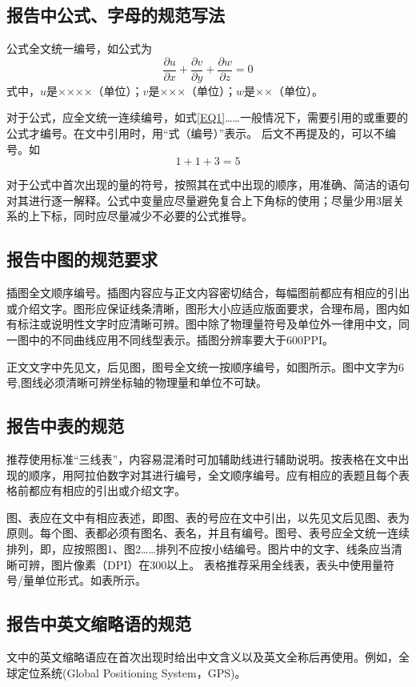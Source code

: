 \documentclass{iceli}
\begin{document}
\subsection{报告中公式、字母的规范写法}
公式全文统一编号，如公式为
\begin{equation}\label{EQ1}
\frac{\partial u}{\partial x}+\frac{\partial v}{\partial y}+\frac{\partial w}{\partial z}=0
\end{equation}
式中，$u$是××××（单位）；$v$是×××（单位）；$w$是××（单位）。

对于公式，应全文统一连续编号，如式\eqref{EQ1}……一般情况下，需要引用的或重要的公式才编号。在文中引用时，用“式（编号）”表示。
后文不再提及的，可以不编号。如
\begin{equation*}
1 + 1 + 3 = 5
\end{equation*}

对于公式中首次出现的量的符号，按照其在式中出现的顺序，用准确、简洁的语句对其进行逐一解释。公式中变量应尽量避免复合上下角标的使用；尽量少用3层关系的上下标，同时应尽量减少不必要的公式推导。

\subsection{报告中图的规范要求}
插图全文顺序编号。插图内容应与正文内容密切结合，每幅图前都应有相应的引出或介绍文字。图形应保证线条清晰，图形大小应适应版面要求，合理布局，图内如有标注或说明性文字时应清晰可辨。图中除了物理量符号及单位外一律用中文，同一图中的不同曲线应用不同线型表示。插图分辨率要大于600PPI。

正文文字中先见文，后见图，图号全文统一按顺序编号，如图所示。图中文字为6号,图线必须清晰可辨坐标轴的物理量和单位不可缺。

\subsection{报告中表的规范}
推荐使用标准“三线表”，内容易混淆时可加辅助线进行辅助说明。按表格在文中出现的顺序，用阿拉伯数字对其进行编号，全文顺序编号。应有相应的表题且每个表格前都应有相应的引出或介绍文字。

图、表应在文中有相应表述，即图、表的号应在文中引出，以先见文后见图、表为原则。每个图、表都必须有图名、表名，并且有编号。图号、表号应全文统一连续排列，即，应按照图1、图2……排列不应按小结编号。图片中的文字、线条应当清晰可辨，图片像素（DPI）在300以上。
表格推荐采用全线表，表头中使用量符号/量单位形式。如表所示。
\subsection{报告中英文缩略语的规范}
文中的英文缩略语应在首次出现时给出中文含义以及英文全称后再使用。例如，全球定位系统(Global Positioning System，GPS)。
\end{document}
